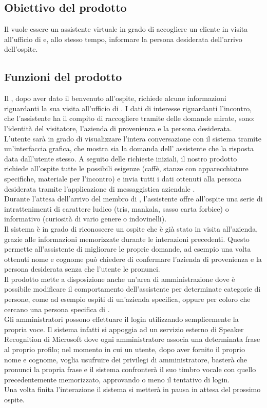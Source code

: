 \subsection{Obiettivo del prodotto}
Il  vuole essere un assistente virtuale in grado di accogliere un cliente in visita all'ufficio di \PROPONENTE{} e, allo stesso tempo, informare la persona desiderata dell'arrivo dell'ospite. 
\subsection{Funzioni del prodotto}
Il , dopo aver dato il benvenuto all'ospite, richiede alcune informazioni riguardanti la sua visita all'ufficio di \PROPONENTE. I dati di interesse riguardanti l'incontro, che l'assistente ha il compito di raccogliere tramite delle domande mirate, sono: l'identità del visitatore, l'azienda di provenienza e la persona desiderata.\\
L'utente sarà in grado di visualizzare l'intera conversazione con il sistema tramite un'interfaccia grafica, che mostra sia la domanda dell' assistente che la risposta data dall'utente stesso.
A seguito delle richieste iniziali, il nostro prodotto richiede all'ospite tutte le possibili esigenze (caffè, stanze con apparecchiature specifiche, materiale per l'incontro) e invia tutti i dati ottenuti alla persona desiderata tramite l'applicazione di messaggistica aziendale .\\
Durante l'attesa dell'arrivo del membro di \PROPONENTE{}, l'assistente offre all'ospite una serie di intrattenimenti di carattere ludico (tris, mankala, sasso carta forbice) o informativo (curiosità di vario genere o indovinelli).\\
Il sistema è in grado di riconoscere un ospite che è già stato in visita all'azienda, grazie alle informazioni memorizzate durante le interazioni precedenti. Questo permette all'assistente di migliorare le proprie domande, ad esempio una volta ottenuti nome e cognome può chiedere di confermare l'azienda di provenienza e la persona desiderata senza che l'utente le pronunci.\\
Il prodotto mette a disposizione anche un'area di amministrazione dove è possibile modificare il comportamento dell'assistente per determinate categorie di persone, come ad esempio ospiti di un'azienda specifica, oppure per coloro che cercano una persona specifica di \PROPONENTE{}. \\
Gli amministratori possono effettuare il login utilizzando semplicemente la propria voce. Il sistema infatti si appoggia ad un servizio esterno di Speaker Recognition di Microsoft dove ogni amministratore associa una determinata frase al proprio profilo; nel momento in cui un utente, dopo aver fornito il proprio nome e cognome, voglia usufruire dei privilegi di amministratore, basterà che pronunci la propria frase e il sistema confronterà il suo timbro vocale con quello precedentemente memorizzato, approvando o meno il tentativo di login.\\
Una volta finita l'interazione il sistema si metterà in pausa in attesa del prossimo ospite.
